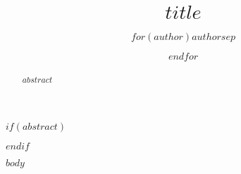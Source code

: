 \documentclass[11pt,a4paper,DIV=12]{scrreprt}
\title{$title$}
\author{$for(author)$$author$$sep$ \and $endfor$}
\begin{document}
\maketitle

$if(abstract)$
\begin{abstract}
    $abstract$
\end{abstract}
$endif$


\linenumbers

$body$
\end{document}
